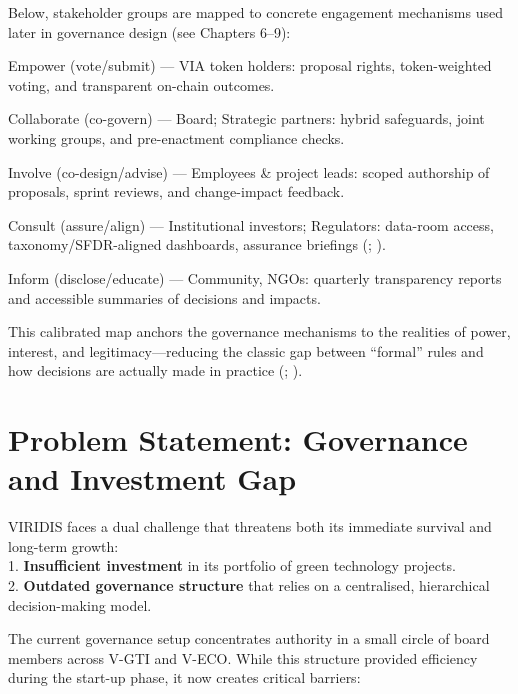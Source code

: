 \documentclass[
  english,
  12pt,
  oneside,
  open=any]{scrbook}
\begin{document}
Below, stakeholder groups are mapped to concrete engagement mechanisms
used later in governance design (see Chapters 6--9):

Empower (vote/submit) --- VIA token holders: proposal rights,
token-weighted voting, and transparent on-chain outcomes.

Collaborate (co-govern) --- Board; Strategic partners: hybrid
safeguards, joint working groups, and pre-enactment compliance checks.

Involve (co-design/advise) --- Employees \& project leads: scoped
authorship of proposals, sprint reviews, and change-impact feedback.

Consult (assure/align) --- Institutional investors; Regulators:
data-room access, taxonomy/SFDR-aligned dashboards, assurance briefings
(; ).

Inform (disclose/educate) --- Community, NGOs: quarterly transparency
reports and accessible summaries of decisions and impacts.

This calibrated map anchors the governance mechanisms to the realities
of power, interest, and legitimacy---reducing the classic gap between
``formal'' rules and how decisions are actually made in practice
(;
).

\section{Problem Statement: Governance and Investment
Gap}\label{sec-problem}

VIRIDIS faces a dual challenge that threatens both its immediate
survival and long-term growth:\\
1. \textbf{Insufficient investment} in its portfolio of green technology
projects.\\
2. \textbf{Outdated governance structure} that relies on a centralised,
hierarchical decision-making model.

The current governance setup concentrates authority in a small circle of
board members across V-GTI and V-ECO. While this structure provided
efficiency during the start-up phase, it now creates critical barriers:
\end{document}
